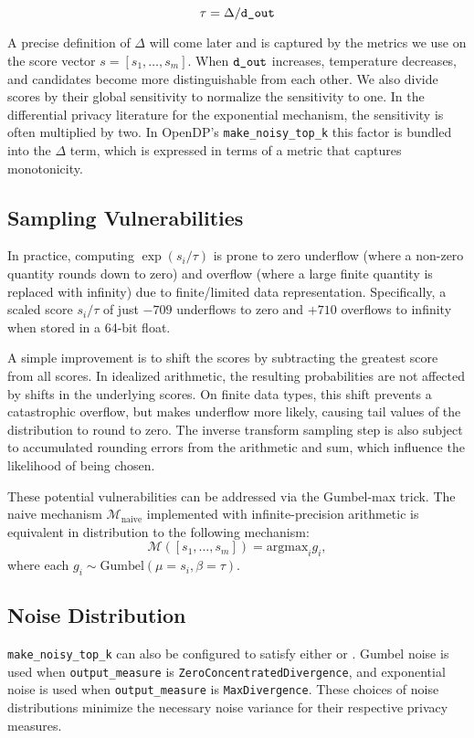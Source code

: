 \documentclass{article}
\begin{document}
\begin{equation} 
    \tau = \Delta / \texttt{d\_out}
\end{equation} 

A precise definition of $\Delta$ will come later and is captured by the metrics we use on the score vector $s = [s_1, \ldots, s_m]$.
When $\texttt{d\_out}$ increases, temperature decreases, and candidates become more distinguishable from each other. 
We also divide scores by their global sensitivity to normalize the sensitivity to one. 
In the differential privacy literature for the exponential mechanism, the sensitivity is often multiplied by two. 
In OpenDP's \texttt{make\_noisy\_top\_k} this factor is bundled into the $\Delta$ term, which is expressed in terms of a metric that captures monotonicity. 
 
\subsection{Sampling Vulnerabilities} 
 
In practice, computing $\exp(s_i / \tau)$ is prone to 
zero underflow (where a non-zero quantity rounds down to zero) 
and overflow (where a large finite quantity is replaced with infinity) 
due to finite/limited data representation.  
Specifically, a scaled score $s_i / \tau$ of just $-709$ underflows to zero and $+710$ overflows to infinity when stored in a 64-bit float.  

A simple improvement is to shift the scores by subtracting the greatest score from all scores. 
In idealized arithmetic, the resulting probabilities are not affected by shifts in the underlying scores. 
On finite data types, this shift prevents a catastrophic overflow, but makes underflow more likely,  
causing tail values of the distribution to round to zero.  
The inverse transform sampling step is also subject to accumulated rounding errors from the arithmetic and sum,  
which influence the likelihood of being chosen. 

These potential vulnerabilities can be addressed via the Gumbel-max trick.
The naive mechanism $\mathcal{M}_\mathrm{naive}$ implemented with infinite-precision arithmetic
is equivalent in distribution to the following mechanism:
\begin{equation} 
    \mathcal{M}([s_1, \ldots, s_m]) = \mathrm{argmax}_i g_i,
\end{equation}
where each $g_i \sim \mathrm{Gumbel}(\mu = s_i, \beta = \tau)$.
 
\subsection{Noise Distribution} 
\texttt{make\_noisy\_top\_k} can also be configured to satisfy 
either  or .
Gumbel noise is used when \texttt{output\_measure} is \texttt{ZeroConcentratedDivergence},
and exponential noise is used when \texttt{output\_measure} is \texttt{MaxDivergence}.
These choices of noise distributions minimize the necessary noise variance for their respective privacy measures.
\end{document}
